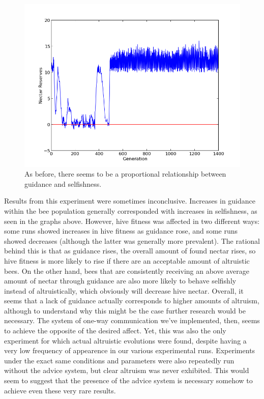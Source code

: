 \documentclass[11pt]{article}
\begin{document}
			\begin{figure}[tbph!]
				\begin{center}
					\includegraphics[scale=.5]{results/gossip_alt_res.png}
				\end{center}
                \caption{As before, there seems to be a proportional relationship between guidance and selfishness.}
				\label{fig:altruistic_reserves}
			\end{figure}


            Results from this experiment were sometimes inconclusive. Increases in guidance within the bee population generally corresponded with increases in selfishness, as seen in the graphs above.  However, hive fitness was affected in two different ways: some runs showed increases in hive fitness as guidance rose, and some runs showed decreases (although the latter was generally more prevalent). The rational behind this is that as guidance rises, the overall amount of found nectar rises, so hive fitness is more likely to rise if there are an acceptable amount of altruistic bees. On the other hand, bees that are consistently receiving an above average amount of nectar through guidance are also more likely to behave selfishly instead of altruistically, which obviously will decrease hive nectar. Overall, it seems that a lack of guidance actually corresponds to higher amounts of altruism, although to understand why this might be the case further research would be necessary. The system of one-way communication we've implemented, then, seems to achieve the opposite of the desired affect. Yet, this was also the only experiment for which actual altruistic evolutions were found, despite having a very low frequency of appearence in our various experimental runs. Experiments under the exact same conditions and parameters were also repeatedly run without the advice system, but clear altruism was never exhibited. This would seem to suggest that the presence of the advice system is necessary somehow to achieve even these very rare results.
\end{document}
